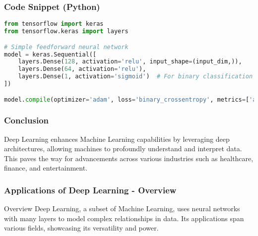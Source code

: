 \documentclass{beamer}
\begin{document}
\begin{frame}[fragile]
    \frametitle{Code Snippet (Python)}
    \begin{lstlisting}[language=Python]
from tensorflow import keras
from tensorflow.keras import layers

# Simple feedforward neural network
model = keras.Sequential([
    layers.Dense(128, activation='relu', input_shape=(input_dim,)),
    layers.Dense(64, activation='relu'),
    layers.Dense(1, activation='sigmoid')  # For binary classification
])

model.compile(optimizer='adam', loss='binary_crossentropy', metrics=['accuracy'])
    \end{lstlisting}
\end{frame}

\begin{frame}[fragile]
    \frametitle{Conclusion}
    Deep Learning enhances Machine Learning capabilities by leveraging deep architectures, allowing machines to profoundly understand and interpret data. This paves the way for advancements across various industries such as healthcare, finance, and entertainment.
\end{frame}

\begin{frame}[fragile]
    \frametitle{Applications of Deep Learning - Overview}
    \begin{block}{Overview}
        Deep Learning, a subset of Machine Learning, uses neural networks with many layers to model complex relationships in data. Its applications span various fields, showcasing its versatility and power.
    \end{block}
\end{frame}
\end{document}
